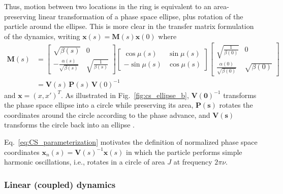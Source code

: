 Thus, motion between two locations in the ring is equivalent to an area-preserving linear transformation of a phase space ellipse, plus rotation of the particle around the ellipse. This is more clear in the transfer matrix formulation of the dynamics, writing $\mathbf{x}(s) = \mathbf{M}(s)\mathbf{x}(0)$ where
%
\begin{equation} \label{eq:CS_parameterization}
\begin{aligned}
    \mathbf{M}(s) &= 
    \begin{bmatrix} 
        \sqrt{\beta(s)} & 0 \\
        -\frac{\alpha(s)}{\sqrt{\beta(s)}} & \sqrt{\frac{1}{\beta(s)}}
    \end{bmatrix}
    \begin{bmatrix} 
        \cos\mu(s) & \sin\mu(s) 
        \\ -\sin\mu(s) & \cos\mu(s) 
    \end{bmatrix}
    \begin{bmatrix} 
        \sqrt{\frac{1}{\beta(0)}} & 0 \\
        \frac{\alpha(0)}{\sqrt{\beta(0)}} & \sqrt{\beta(0)}
    \end{bmatrix} \\
    &= \mathbf{V}(s) \, \mathbf{P}(s) \, \mathbf{V}(0)^{-1} 
\end{aligned}
\end{equation}
%
and $\mathbf{x} = (x, x')^T$. As illustrated in Fig.~\ref{fig:cs_ellipse_b}, $\mathbf{V(0)}^{-1}$ transforms the phase space ellipse into a circle while preserving its area, $\mathbf{P(s)}$ rotates the coordinates around the circle according to the phase advance, and $\mathbf{V(s)}$ transforms the circle back into an ellipse \cite{Lee2011}.

Eq.~\eqref{eq:CS_parameterization} motivates the definition of normalized phase space coordinates $\mathbf{x}_n(s) = \mathbf{V}(s)^{-1} \mathbf{x}(s)$ in which the particle performs simple harmonic oscillations, i.e., rotates in a circle of area $J$ at frequency $2\pi\nu$. 




\subsubsection{Linear (coupled) dynamics}

